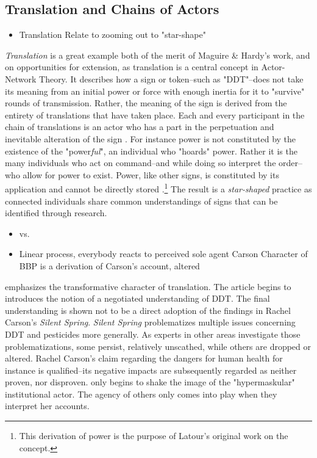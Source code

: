 
\subsection*{Translation and Chains of Actors}

\begin{itemize}
	\item Translation
		\subitem \citet{Latour1984,Latour2005b}
		\subitem Relate to zooming out to "star-shape" \citep{Nicolini2009}
\end{itemize}

\textit{Translation} is a great example both of the merit of Maguire \& Hardy's work, and on opportunities for extension, as translation is a central concept in Actor-Network Theory. It describes how a sign or token--such as "DDT"--does not take its meaning from an initial power or force with enough inertia for it to "survive" rounds of transmission. Rather, the meaning of the sign is derived from the entirety of translations that have taken place. Each and every participant in the chain of translations is an actor who has a part in the perpetuation and inevitable alteration of the sign \citep{Latour2005b}. For instance power is not constituted by the existence of the "power\textit{ful}", an individual who "hoards" power. Rather it is the many individuals who act on command--and while doing so interpret the order--who allow for power to exist. Power, like other signs, is constituted by its application and cannot be directly stored \citep{Latour1984}.\footnote{This derivation of power is the purpose of Latour's original work on the concept.} The result is a \textit{star-shaped} \citep[cf.][]{Nicolini2009} practice as connected individuals share common understandings of signs that can be identified through research.


\begin{itemize}
	\item \citet{Maguire2009} vs. \citet{Hardy2020}
	\item \citet{Maguire2009}
		\subitem Linear process, everybody reacts to perceived sole agent Carson
		\subitem Character of BBP is a derivation of Carson's account, altered
\end{itemize}

\citet{Maguire2009} emphasizes the transformative character of translation. The article begins to introduces the notion of a negotiated understanding of DDT. The final understanding is shown not to be a direct adoption of the findings in Rachel Carson's \textit{Silent Spring}. \textit{Silent Spring} problematizes multiple issues concerning DDT and pesticides more generally. As experts in other areas investigate those problematizations, some persist, relatively unscathed, while others are dropped or altered. Rachel Carson's claim regarding the dangers for human health for instance is qualified--its negative impacts are subsequently regarded as neither proven, nor disproven. \citet{Maguire2009} only begins to shake the image of the "hypermaskular" \citep[cf.][]{Suddaby2017} institutional actor. The agency of others only comes into play when they interpret her accounts. 

